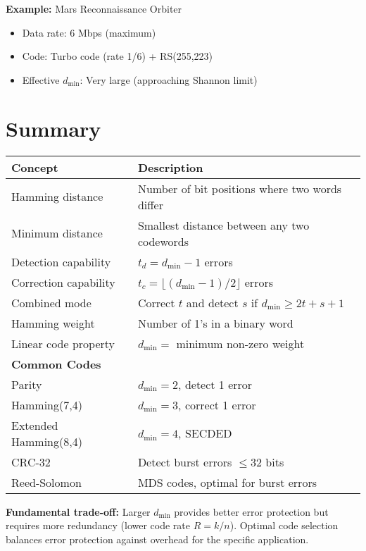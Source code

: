 \textbf{Example:} Mars Reconnaissance Orbiter
\begin{itemize}
\item Data rate: 6 Mbps (maximum)
\item Code: Turbo code (rate 1/6) + RS(255,223)
\item Effective $d_{\min}$: Very large (approaching Shannon limit)
\end{itemize}

\section{Summary}

\begin{center}
\begin{tabular}{@{}ll@{}}
\toprule
\textbf{Concept} & \textbf{Description} \\
\midrule
Hamming distance & Number of bit positions where two words differ \\
Minimum distance & Smallest distance between any two codewords \\
Detection capability & $t_d = d_{\min} - 1$ errors \\
Correction capability & $t_c = \lfloor(d_{\min} - 1)/2\rfloor$ errors \\
Combined mode & Correct $t$ and detect $s$ if $d_{\min} \geq 2t + s + 1$ \\
Hamming weight & Number of 1's in a binary word \\
Linear code property & $d_{\min} = $ minimum non-zero weight \\
\midrule
\textbf{Common Codes} & \\
\midrule
Parity & $d_{\min} = 2$, detect 1 error \\
Hamming(7,4) & $d_{\min} = 3$, correct 1 error \\
Extended Hamming(8,4) & $d_{\min} = 4$, SECDED \\
CRC-32 & Detect burst errors $\leq 32$ bits \\
Reed-Solomon & MDS codes, optimal for burst errors \\
\bottomrule
\end{tabular}
\end{center}

\begin{keyconcept}
\textbf{Fundamental trade-off:} Larger $d_{\min}$ provides better error protection but requires more redundancy (lower code rate $R = k/n$). Optimal code selection balances error protection against overhead for the specific application.
\end{keyconcept}

